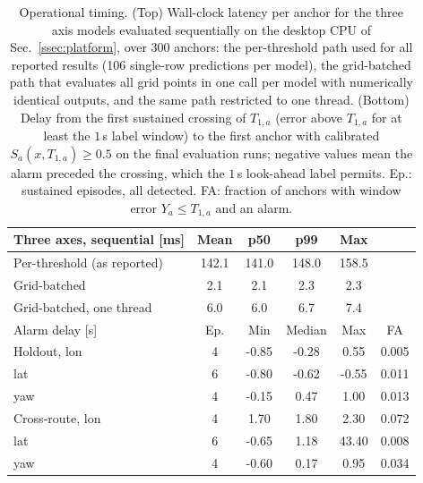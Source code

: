 \begin{table}[H]
\caption{Operational timing. (Top) Wall-clock latency per anchor for the three axis models evaluated sequentially on the desktop CPU of Sec.~\ref{ssec:platform}, over 300 anchors: the per-threshold path used for all reported results (106 single-row predictions per model), the grid-batched path that evaluates all grid points in one call per model with numerically identical outputs, and the same path restricted to one thread. (Bottom) Delay from the first sustained crossing of $T_{1,a}$ (error above $T_{1,a}$ for at least the $1$\,s label window) to the first anchor with calibrated $S_a(x,T_{1,a})\ge0.5$ on the final evaluation runs; negative values mean the alarm preceded the crossing, which the $1$\,s look-ahead label permits. Ep.: sustained episodes, all detected. FA: fraction of anchors with window error $Y_a \le T_{1,a}$ and an alarm.}
\label{tab:timing}
\centering
\footnotesize
\setlength{\tabcolsep}{3pt}
\begin{tabular}{lccccc}
\toprule
Three axes, sequential [ms] & Mean & p50 & p99 & Max & \\
\midrule
Per-threshold (as reported) & 142.1 & 141.0 & 148.0 & 158.5 & \\
Grid-batched & 2.1 & 2.1 & 2.3 & 2.3 & \\
Grid-batched, one thread & 6.0 & 6.0 & 6.7 & 7.4 & \\
\midrule
Alarm delay [s] & Ep. & Min & Median & Max & FA \\
\midrule
Holdout, lon & 4 & -0.85 & -0.28 & 0.55 & 0.005 \\
lat & 6 & -0.80 & -0.62 & -0.55 & 0.011 \\
yaw & 4 & -0.15 & 0.47 & 1.00 & 0.013 \\
Cross-route, lon & 4 & 1.70 & 1.80 & 2.30 & 0.072 \\
lat & 6 & -0.65 & 1.18 & 43.40 & 0.008 \\
yaw & 4 & -0.60 & 0.17 & 0.95 & 0.034 \\
\bottomrule
\end{tabular}
\end{table}
